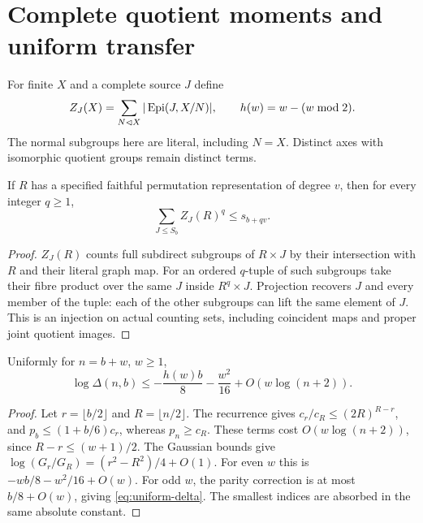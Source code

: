 \section{Complete quotient moments and uniform transfer}
\label{sec:general-transfer}
For finite $X$ and a complete source $J$ define
\[
 Z_J(X)=\sum_{N\lhd X}|\operatorname{Epi}(J,X/N)|,\qquad
 h(w)=w-(w\bmod2).
\]
The normal subgroups here are literal, including $N=X$. Distinct axes
with isomorphic quotient groups remain distinct terms.

\begin{lemma}\label{lem:quotient-moment}
If $R$ has a specified faithful permutation representation of degree
$v$, then for every integer $q\geq1$,
\[
 \sum_{J\leq S_b}Z_J(R)^q\leq s_{b+qv}.
\]
\end{lemma}
\begin{proof}
$Z_J(R)$ counts full subdirect subgroups of $R\times J$ by their
intersection with $R$ and their literal graph map. For an ordered
$q$-tuple of such subgroups take their fibre product over the same
$J$ inside $R^q\times J$. Projection recovers $J$ and every member
of the tuple: each of the other subgroups can lift the same element
of $J$. This is an injection on actual counting sets, including
coincident maps and proper joint quotient images.
\end{proof}

\begin{lemma}\label{lem:uniform-delta}
Uniformly for $n=b+w$, $w\geq1$,
\begin{equation}\label{eq:uniform-delta}
 \log\Delta(n,b)\leq-\frac{h(w)b}{8}-\frac{w^2}{16}
                                      +O(w\log(n+2)).
\end{equation}
\end{lemma}
\begin{proof}
Let $r=\lfloor b/2\rfloor$ and $R=\lfloor n/2\rfloor$.
The recurrence gives $c_r/c_R\leq(2R)^{R-r}$, and
$p_b\leq(1+b/6)c_r$, whereas $p_n\geq c_R$.
These terms cost $O(w\log(n+2))$, since $R-r\leq(w+1)/2$.
The Gaussian bounds give
$\log(G_r/G_R)=(r^2-R^2)/4+O(1)$.
For even $w$ this is $-wb/8-w^2/16+O(w)$.
For odd $w$, the parity correction is at most $b/8+O(w)$,
giving \eqref{eq:uniform-delta}. The smallest indices are absorbed
in the same absolute constant.
\end{proof}

